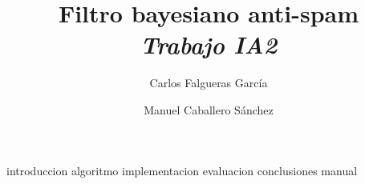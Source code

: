 \documentclass[pdftex,a4paper,12pt]{article}
\title{{\Huge Filtro bayesiano anti-spam} \\ {\large\slshape Trabajo IA2}}
\author{Carlos Falgueras García \and Manuel Caballero Sánchez}
\date{}
\begin{document}
\maketitle
\clearpage
\tableofcontents
\setlength{\parskip}{1em}
\thispagestyle{empty} %
\clearpage

{introduccion}
\clearpage
{algoritmo}
\clearpage
{implementacion}
\clearpage
{evaluacion}
\clearpage
{conclusiones}
\clearpage
{manual}
\clearpage
\nocite{*}

\end{document}
